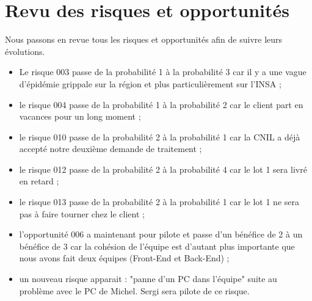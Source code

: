 \documentclass [a4paper] {article}
\begin{document}
\section{Revu des risques et opportunités}
Nous passons en revue tous les risques et opportunités afin de suivre leurs évolutions. 
\begin{itemize}
	\item Le risque 003 passe de la probabilité 1 à la probabilité 3 car il y a une vague d'épidémie grippale sur la région et plus particulièrement sur l'INSA ;
	\item le risque 004 passe de la probabilité 1 à la probabilité 2 car le client part en vacances pour un long moment ;
	\item le risque 010 passe de la probabilité 2 à la probabilité 1 car la CNIL a déjà accepté notre deuxième demande de traitement ;
	\item le risque 012 passe de la probabilité 2 à la probabilité 4 car le lot 1 sera livré en retard ;
	\item le risque 013 passe de la probabilité 2 à la probabilité 1 car le lot 1 ne sera pas à faire tourner chez le client ;
	\item l'opportunité 006 a maintenant pour pilote \Michel{} et passe d'un bénéfice de 2 à un bénéfice de 3 car la cohésion de l'équipe est d'autant plus importante que nous avons fait deux équipes (Front-End et Back-End) ;
	\item un nouveau risque apparait : "panne d'un PC dans l'équipe" suite au problème avec le PC de Michel. Sergi sera pilote de ce risque.
\end{itemize}





\end{document}
